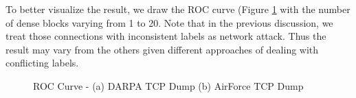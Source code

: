 To better visualize the result, we draw the ROC curve (Figure \ref{fig:t4.3_roc} with the number of dense blocks varying from 1 to 20. Note that in the previous discussion, we treat those connections with inconsistent labels as network attack. Thus the result may vary from the others given different approaches of dealing with conflicting labels. 

\begin{figure}[!ht]
    \centering
    \caption{ROC Curve - (a) DARPA TCP Dump (b) AirForce TCP Dump}
    \label{fig:t4.3_roc}
\end{figure}

